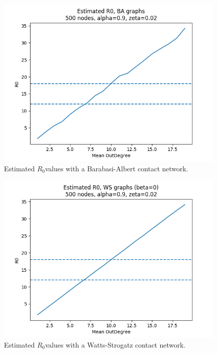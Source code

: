 \documentclass[conference]{IEEEtran}
\newcommand{\ro}{$R_0$}
\begin{document}
\begin{figure}[t]
    \centering
    \includegraphics[scale=0.5]{images/est_ro_ba.png}
    \caption{Estimated \ro values with a Barabasi-Albert contact network.}
    \label{fig:r0_ba}
\end{figure}

\begin{figure}[t]
    \centering
    \includegraphics[scale=0.5]{images/est_r0_ws.png}
    \caption{Estimated \ro values with a Watts-Strogatz contact network.}
    \label{fig:r0_ws}
\end{figure}
\end{document}

